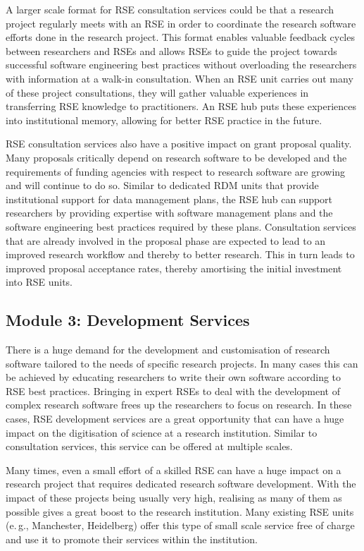 \documentclass[a4paper]{article}
\newcommand*{\eg}{e.\,g.,\xspace}
\begin{document}
A larger scale format for RSE consultation services could be that a research project regularly meets with an RSE in order to coordinate the research software efforts done in the research project.
This format enables valuable feedback cycles between researchers and RSEs and allows RSEs to guide the project towards successful software engineering best practices without overloading the researchers with information at a walk-in consultation.
When an RSE unit carries out many of these project consultations, they will gather valuable experiences in transferring RSE knowledge to practitioners.
An RSE hub puts these experiences into institutional memory, allowing for better RSE practice in the future.

RSE consultation services also have a positive impact on grant proposal quality.
Many proposals critically depend on research software to be developed and the requirements of funding agencies with respect to research software are growing and will continue to do so.
Similar to dedicated RDM units that provide institutional support for data management plans, the RSE hub can support researchers by providing expertise with software management plans and the software engineering best practices required by these plans.
Consultation services that are already involved in the proposal phase are expected to lead to an improved research workflow and thereby to better research.
This in turn leads to improved proposal acceptance rates, thereby amortising the initial investment into RSE units.


\subsection{Module 3: Development Services}%
\label{sec:development}

There is a huge demand for the development and customisation of research software tailored to the needs of specific research projects.
In many cases this can be achieved by educating researchers to write their own software according to RSE best practices.
Bringing in expert RSEs to deal with the development of complex research software frees up the researchers to focus on research.
In these cases, RSE development services are a great opportunity that can have a huge impact on the digitisation of science at a research institution.
Similar to consultation services, this service can be offered at multiple scales.

Many times, even a small effort of a skilled RSE can have a huge impact on a research project that requires dedicated research software development.
With the impact of these projects being usually very high, realising as many of them as possible gives a great boost to the research institution.
Many existing RSE units (\eg{} Manchester, Heidelberg) offer this type of small scale service free of charge and use it to promote their services within the institution.
\end{document}
